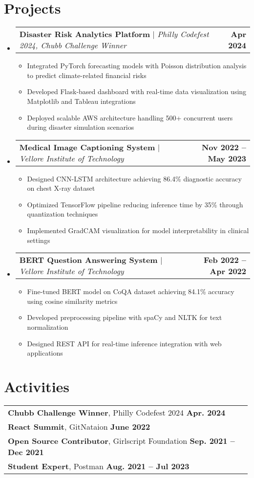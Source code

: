 \documentclass[letterpaper,11pt]{article}
\makeatletter
\newcommand{\resumeItem}[1]{
  \item\small{
    {#1 \vspace{-2pt}}
  }
}
\newcommand{\resumeProjectHeading}[2]{
    \item
    \begin{tabular*}{1.001\textwidth}{l@{\extracolsep{\fill}}r}
      \small#1 & \textbf{\small #2}\\
    \end{tabular*}\vspace{-3pt}
}
\newcommand{\resumeSubHeadingListStart}{\begin{itemize}[leftmargin=0.0in, label={}]}
\newcommand{\resumeSubHeadingListEnd}{\end{itemize}}
\newcommand{\resumeItemListStart}{\begin{itemize}}
\newcommand{\resumeItemListEnd}{\end{itemize}\vspace{-5pt}}
\makeatother
\begin{document}
\section{Projects}
\vspace{-5pt}
\resumeSubHeadingListStart
    \resumeProjectHeading
    {\textbf{Disaster Risk Analytics Platform} $|$ \emph{Philly Codefest 2024, Chubb Challenge Winner}} {Apr 2024}
    \resumeItemListStart
        \resumeItem{Integrated PyTorch forecasting models with Poisson distribution analysis to predict climate-related financial risks}
        \resumeItem{Developed Flask-based dashboard with real-time data visualization using Matplotlib and Tableau integrations}
        \resumeItem{Deployed scalable AWS architecture handling 500+ concurrent users during disaster simulation scenarios}
    \resumeItemListEnd
    
    \resumeProjectHeading
    {\textbf{Medical Image Captioning System} $|$ \emph{Vellore Institute of Technology}} {Nov 2022 -- May 2023}
    \resumeItemListStart
        \resumeItem{Designed CNN-LSTM architecture achieving 86.4\% diagnostic accuracy on chest X-ray dataset}
        \resumeItem{Optimized TensorFlow pipeline reducing inference time by 35\% through quantization techniques}
        \resumeItem{Implemented GradCAM visualization for model interpretability in clinical settings}
    \resumeItemListEnd
    
    \resumeProjectHeading
    {\textbf{BERT Question Answering System} $|$ \emph{Vellore Institute of Technology}} {Feb 2022 -- Apr 2022}
    \resumeItemListStart
        \resumeItem{Fine-tuned BERT model on CoQA dataset achieving 84.1\% accuracy using cosine similarity metrics}
        \resumeItem{Developed preprocessing pipeline with spaCy and NLTK for text normalization}
        \resumeItem{Designed REST API for real-time inference integration with web applications}
    \resumeItemListEnd
\resumeSubHeadingListEnd

\section{Activities}
\begin{tabular}{p{0.99\linewidth}}
    \hspace{0.15in}\textbf{Chubb Challenge Winner}, Philly Codefest 2024
        \hfill \textbf{Apr. 2024} \\
            \hspace{0.15in}\textbf{React Summit}, GitNataion
        \hfill \textbf{June 2022}\\
    \hspace{0.15in}\textbf{Open Source Contributor}, Girlscript Foundation
        \hfill \textbf{Sep. 2021 -- Dec 2021}\\

    \hspace{0.15in}\textbf{Student Expert}, Postman
        \hfill \textbf{Aug. 2021 -- Jul 2023} 
    
\end{tabular}
\vspace{-15pt}
\end{document}
